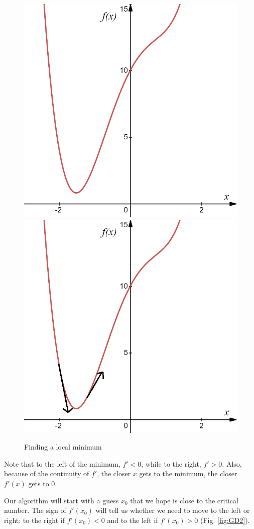 \documentclass[
]{book}
\theoremstyle{definition}
\theoremstyle{definition}
\theoremstyle{definition}
\theoremstyle{definition}
\theoremstyle{remark}
\begin{document}
\begin{figure}

{\centering \includegraphics[width=0.4\linewidth]{images/dg1} \includegraphics[width=0.4\linewidth]{images/dg2} 

}

\caption{Finding a local minimum}\label{fig:GD1}
\end{figure}

Note that to the left of the minimum, \(f'<0\), while to the right, \(f'>0\). Also, because of the continuity of \(f'\), the closer \(x\) gets to the minimum, the closer \(f'(x)\) gets to 0.

Our algorithm will start with a guess \(x_0\) that we hope is close to the critical number. The sign of \(f'(x_0)\) will tell us whether we need to move to the left or right: to the right if \(f'(x_0)<0\) and to the left if \(f'(x_0)>0\) (Fig. \ref{fig:GD2}).
\end{document}
